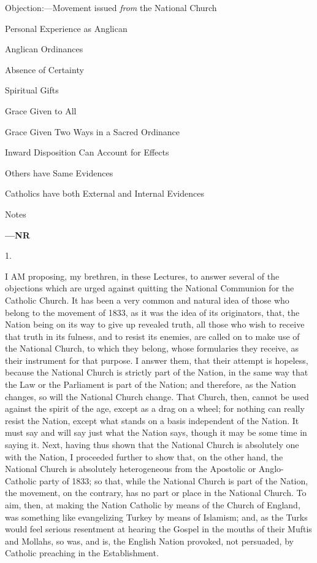
Objection:—Movement issued \emph{from} the
National Church

Personal Experience as Anglican

Anglican Ordinances

Absence of Certainty

Spiritual Gifts

Grace Given to All

Grace Given Two Ways in a Sacred Ordinance

Inward Disposition Can Account for Effects

Others have Same Evidences

Catholics have both External and
Internal Evidences

Notes

\textbf{—NR}

1.

I AM proposing, my brethren, in these Lectures, to answer several
of the objections which are urged against quitting the National
Communion for the Catholic Church. It has been a very common and
natural idea of those who belong to the movement of 1833, as it was
the idea of its originators, that, the Nation being on its way to give
up revealed truth, all those who wish to receive that truth in its
fulness, and to resist its enemies, are called on to make use of the
National Church, to which they belong, whose formularies they receive,
as their instrument for that purpose. I answer them, that their
attempt is hopeless, because the National Church is strictly part of
the Nation, in the same way that the Law or the Parliament is part of
the Nation; and therefore, as the Nation changes, so will the National
Church change. That Church, then, cannot be used against the spirit of
the age, except as a drag on a wheel; for nothing can really resist
the Nation, except what stands on a basis independent of the Nation.
It must say and will say just what the Nation says, though it may be
some time in saying it. Next, having thus shown that the National
Church is absolutely one with the Nation, I proceeded further to show
that, on the other hand, the National Church is absolutely
heterogeneous from the Apostolic or Anglo-Catholic party of 1833; so
that, while the National Church is part of the Nation, the movement,
on the contrary, has no part or place in the National Church. To aim,
then, at making the Nation Catholic by means of the Church of England,
was something like evangelizing Turkey by means of Islamism; and, as
the Turks would feel serious resentment at hearing the Gospel in the
mouths of their Muftis and Mollahs, so was, and is, the English Nation
provoked, not persuaded, by Catholic preaching in the Establishment.

